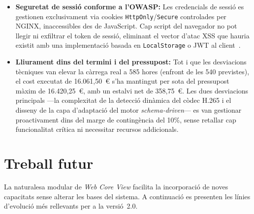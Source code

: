\begin{itemize}
    \item \textbf{Seguretat de sessió conforme a l'OWASP:} Les credencials de sessió es gestionen exclusivament via cookies \texttt{HttpOnly}/\allowbreak{}\texttt{Secure} controlades per NGINX, inaccessibles des de JavaScript. Cap script del navegador no pot llegir ni exfiltrar el token de sessió, eliminant el vector d'atac XSS que hauria existit amb una implementació basada en \texttt{LocalStorage} o JWT al client~\cite{owasp_session}.

    \item \textbf{Lliurament dins del termini i del pressupost:} Tot i que les desviacions tècniques van elevar la càrrega real a 585 hores (enfront de les 540 previstes), el cost executat de 16.061,50~\euro{} s'ha mantingut per sota del pressupost màxim de 16.420,25~\euro{}, amb un estalvi net de 358,75~\euro{}. Les dues desviacions principals —la complexitat de la detecció dinàmica del còdec H.265 i el disseny de la capa d'adaptació del motor \textit{schema-driven}— es van gestionar proactivament dins del marge de contingència del 10\%, sense retallar cap funcionalitat crítica ni necessitar recursos addicionals.
\end{itemize}

\section{Treball futur}

La naturalesa modular de \textit{Web Core View} facilita la incorporació de noves capacitats sense alterar les bases del sistema. A continuació es presenten les línies d'evolució més rellevants per a la versió~2.0.

